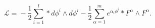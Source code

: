 \begin{equation}
\mathcal{L=}-\frac{1}{2}\sum\limits_{i=1}^{l}\ast d\phi ^{i}\wedge d%
\phi ^{i}-\frac{1}{2}\sum\limits_{\alpha =1}^{m}e^{\alpha _{i}\phi
^{i}}\ast F^{\alpha }\wedge F^{\alpha }.
\end{equation}

